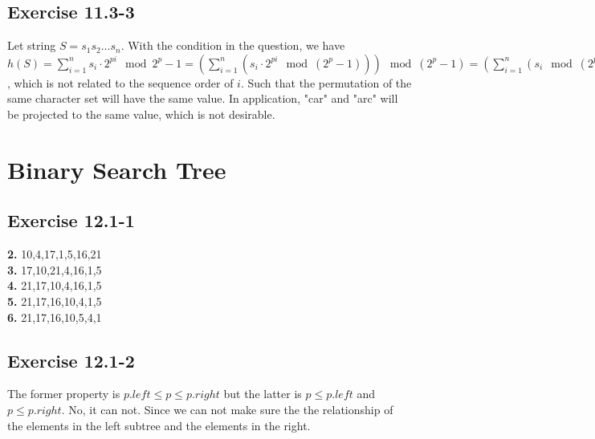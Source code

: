 \documentclass[12pt]{article}
\theoremstyle{definition}
\theoremstyle{remark}
\begin{document}
\subsection*{Exercise 11.3-3}
Let string $S=s_1s_2...s_n$. With the condition in the question, we have $h(S)=\sum_{i=1}^ns_i\cdot2^{pi}\mod{2^p-1}=(\sum_{i=1}^n(s_i\cdot2^{pi}\mod(2^p-1)))\mod(2^p-1)=(\sum_{i=1}^n(s_i\mod(2^p-1)))\mod(2^p-1)$, which is not related to the sequence order of $i$. Such that the permutation of the same character set will have the same value. In application, "car" and "arc" will be projected to the same value, which is not desirable.
\section{Binary Search Tree}
\subsection*{Exercise 12.1-1}
\textbf{2.} 10,4,17,1,5,16,21\\
\textbf{3.} 17,10,21,4,16,1,5\\
\textbf{4.} 21,17,10,4,16,1,5\\
\textbf{5.} 21,17,16,10,4,1,5\\
\textbf{6.} 21,17,16,10,5,4,1
\subsection*{Exercise 12.1-2}
The former property is $p.left\le p\le p.right$ but the latter is $p\le p.left$ and $p\le p.right$. No, it can not. Since we can not make sure the the relationship of the elements in the left subtree and the elements in the right.
\end{document}
